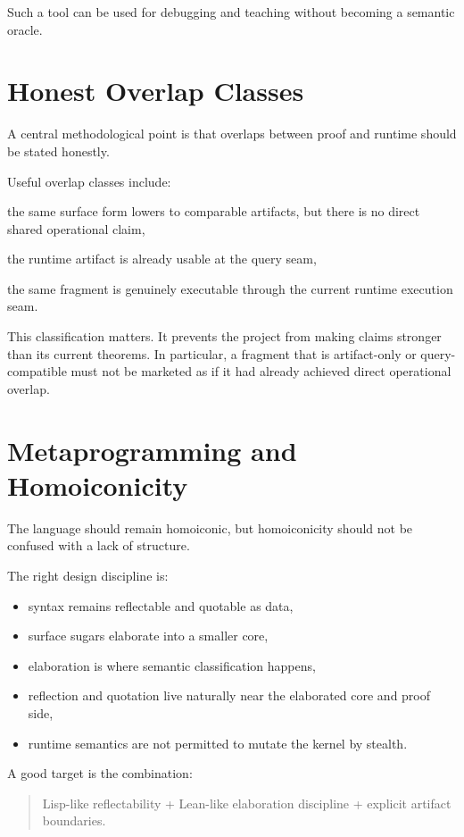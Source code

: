 \documentclass[11pt]{article}
\begin{document}
Such a tool can be used for debugging and teaching without becoming a semantic oracle.

\section{Honest Overlap Classes}
A central methodological point is that overlaps between proof and runtime should be stated honestly.

Useful overlap classes include:
\begin{description}[leftmargin=2.6cm,style=nextline]
  \item[artifact-only] the same surface form lowers to comparable artifacts, but there is no direct shared operational claim,
  \item[query-compatible] the runtime artifact is already usable at the query seam,
  \item[direct-exec] the same fragment is genuinely executable through the current runtime execution seam.
\end{description}

This classification matters. It prevents the project from making claims stronger than its current theorems. In particular, a fragment that is artifact-only or query-compatible must not be marketed as if it had already achieved direct operational overlap.

\section{Metaprogramming and Homoiconicity}
The language should remain homoiconic, but homoiconicity should not be confused with a lack of structure.

The right design discipline is:
\begin{itemize}
  \item syntax remains reflectable and quotable as data,
  \item surface sugars elaborate into a smaller core,
  \item elaboration is where semantic classification happens,
  \item reflection and quotation live naturally near the elaborated core and proof side,
  \item runtime semantics are not permitted to mutate the kernel by stealth.
\end{itemize}

A good target is the combination:
\begin{quote}
Lisp-like reflectability + Lean-like elaboration discipline + explicit artifact boundaries.
\end{quote}
\end{document}
